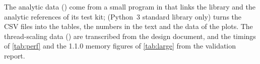 \noindent The analytic data ()
come from a small program in 
that links the library and the analytic references of its test kit;
(Python~3 standard library only) turns the CSV files into the tables, the
 numbers in the text and the data of the plots.
The thread-scaling data () are transcribed from
the design document, and the timings of \cref{tab:perf} and the 1.1.0 memory
figures of \cref{tab:large} from the validation report.
